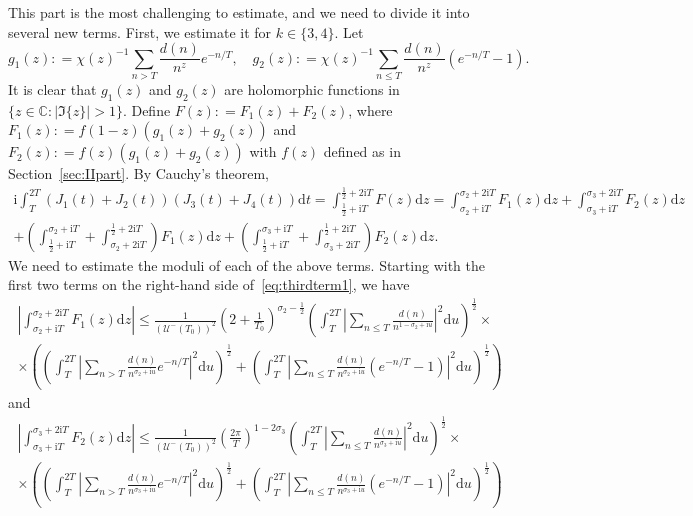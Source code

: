 \documentclass[a4paper,reqno]{amsart}
\theoremstyle{definition}
\newcommand{\C}{\mathbb{C}}
\newcommand{\de}[0]{\mathrel{\mathop:}=}
\newcommand{\ie}[0]{\mathrm{i}}
\newcommand{\dif}[1]{\mathrm{d}#1}
\begin{document}
This part is the most challenging to estimate, and we need to divide it into several new terms. First, we estimate it for $k\in\{3,4\}$. Let 
\[
g_1(z)\de \chi(z)^{-1}\sum_{n>T}\frac{d(n)}{n^{z}}e^{-n/T}, \quad g_2(z)\de \chi(z)^{-1}\sum_{n\leq T}\frac{d(n)}{n^{z}}\left(e^{-n/T}-1\right). 
\]
It is clear that $g_1(z)$ and $g_2(z)$ are holomorphic functions in $\{z\in\C\colon |\Im\{z\}|>1\}$. Define $F(z)\de F_{1}(z)+F_2(z)$, where $F_1(z)\de f(1-z)\left(g_1(z)+g_2(z)\right)$ and $F_2(z)\de f(z)\left(g_1(z)+g_2(z)\right)$ with $f(z)$ defined as in Section~\ref{sec:IIpart}. By Cauchy's theorem,
\begin{multline}
\label{eq:thirdterm1}
\ie\int_{T}^{2T}\left(J_1(t)+J_2(t)\right)\left(J_3(t)+J_4(t)\right)\dif{t} = \int_{\frac{1}{2}+\ie T}^{\frac{1}{2}+2\ie T}F(z)\dif{z} = \int_{\sigma_2+\ie T}^{\sigma_2+2\ie T}F_1(z)\dif{z} + \int_{\sigma_3+\ie T}^{\sigma_3+2\ie T}F_2(z)\dif{z} \\
+ \left(\int_{\frac{1}{2}+\ie T}^{\sigma_2+\ie T}+\int_{\sigma_2+2\ie T}^{\frac{1}{2}+2\ie T}\right)F_1(z)\dif{z} + \left(\int_{\frac{1}{2}+\ie T}^{\sigma_3+\ie T}+\int_{\sigma_3+2\ie T}^{\frac{1}{2}+2\ie T}\right)F_{2}(z)\dif{z}.
\end{multline}
We need to estimate the moduli of each of the above terms. Starting with the first two terms on the right-hand side of~\eqref{eq:thirdterm1}, we have
\begin{multline*}
\left|\int_{\sigma_2+\ie T}^{\sigma_2+2\ie T}F_1(z)\dif{z}\right| \leq \frac{1}{\left(\mathcal{U}^{-}(T_0)\right)^{2}}\left(2+\frac{1}{T_0}\right)^{\sigma_2-\frac{1}{2}}\left(\int_{T}^{2T}\left|\sum_{n\leq T}\frac{d(n)}{n^{1-\sigma_2+\ie u}}\right|^{2}\dif{u}\right)^{\frac{1}{2}} \times \\
\times\left(\left(\int_{T}^{2T}\left|\sum_{n>T}\frac{d(n)}{n^{\sigma_2+\ie u}}e^{-n/T}\right|^{2}\dif{u}\right)^{\frac{1}{2}}+\left(\int_{T}^{2T}\left|\sum_{n\leq T}\frac{d(n)}{n^{\sigma_2+\ie u}}\left(e^{-n/T}-1\right)\right|^{2}\dif{u}\right)^{\frac{1}{2}}\right)
\end{multline*}
and
\begin{multline*}
\left|\int_{\sigma_3+\ie T}^{\sigma_3+2\ie T}F_2(z)\dif{z}\right| \leq \frac{1}{\left(\mathcal{U}^{-}(T_0)\right)^{2}}\left(\frac{2\pi}{T}\right)^{1-2\sigma_3}\left(\int_{T}^{2T}\left|\sum_{n\leq T}\frac{d(n)}{n^{\sigma_3+\ie u}}\right|^{2}\dif{u}\right)^{\frac{1}{2}} \times \\
\times\left(\left(\int_{T}^{2T}\left|\sum_{n>T}\frac{d(n)}{n^{\sigma_3+\ie u}}e^{-n/T}\right|^{2}\dif{u}\right)^{\frac{1}{2}}+\left(\int_{T}^{2T}\left|\sum_{n\leq T}\frac{d(n)}{n^{\sigma_3+\ie u}}\left(e^{-n/T}-1\right)\right|^{2}\dif{u}\right)^{\frac{1}{2}}\right)
\end{multline*}
\end{document}
